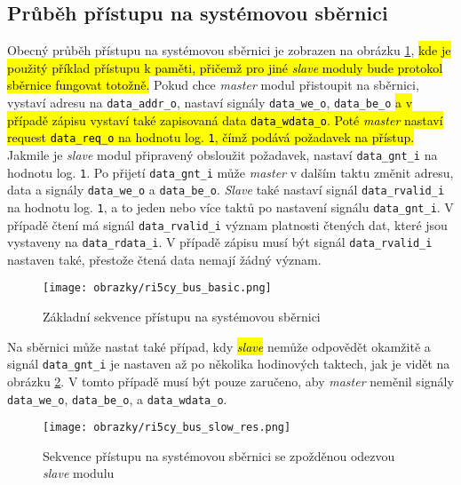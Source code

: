 \subsection{Průběh přístupu na systémovou sběrnici}
Obecný průběh přístupu na systémovou sběrnici je zobrazen na obrázku \ref{fig:ri5cy_bus_basic}, \hl{kde je použitý příklad přístupu k paměti, přičemž pro jiné \textit{slave} moduly bude protokol sběrnice fungovat totožně.} Pokud chce \textit{master} modul přistoupit na sběrnici, vystaví adresu na \texttt{data\_addr\_o}, nastaví signály \texttt{data\_we\_o}, \texttt{data\_be\_o} \hl{a v případě zápisu vystaví také zapisovaná data \texttt{data\_wdata\_o}. Poté \textit{master} nastaví request \texttt{data\_req\_o} na hodnotu log. \texttt{1}, čímž podává požadavek na přístup.} Jakmile je \textit{slave} modul připravený obsloužit požadavek, nastaví \texttt{data\_gnt\_i} na hodnotu log. \texttt{1}. Po přijetí \texttt{data\_gnt\_i} může \textit{master} v dalším taktu změnit adresu, data a signály \texttt{data\_we\_o} a \texttt{data\_be\_o}. \textit{Slave} také nastaví signál \texttt{data\_rvalid\_i} na hodnotu log. \texttt{1}, a to jeden nebo více taktů po nastavení signálu \texttt{data\_gnt\_i}. V případě čtení má signál \texttt{data\_rvalid\_i} význam platnosti čtených dat, které jsou vystaveny na \texttt{data\_rdata\_i}. V případě zápisu musí být signál \texttt{data\_rvalid\_i} nastaven také, přestože čtená data nemají žádný význam. \cite{ri5cy}
 
\begin{figure}[t]
  \begin{center}
    \texttt{[image: obrazky/ri5cy\_bus\_basic.png]}
  \end{center}
  \caption{Základní sekvence přístupu na systémovou sběrnici \cite{ri5cy}}
	\label{fig:ri5cy_bus_basic}
\end{figure}

Na sběrnici může nastat také případ, kdy \hl{\textit{slave}} nemůže odpovědět okamžitě a signál \texttt{data\_gnt\_i} je nastaven až po několika hodinových taktech, jak je vidět na obrázku \ref{fig:ri5cy_bus_slow_res}. V tomto případě musí být pouze zaručeno, aby \textit{master} neměnil signály \texttt{data\_we\_o}, \texttt{data\_be\_o}, a \texttt{data\_wdata\_o}. 

\begin{figure}[H]
  \begin{center}
    \texttt{[image: obrazky/ri5cy\_bus\_slow\_res.png]}
  \end{center}
  \caption{Sekvence přístupu na systémovou sběrnici se zpožděnou odezvou \textit{slave} modulu \cite{ri5cy}}
	\label{fig:ri5cy_bus_slow_res}
\end{figure}


